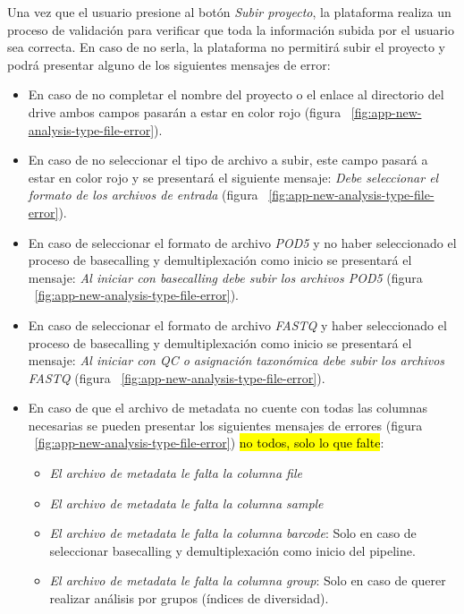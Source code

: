 

Una vez que el usuario presione al botón \textit{Subir proyecto}, la plataforma realiza un proceso de validación para verificar que toda la información subida por el usuario sea correcta. En caso de no serla, la plataforma no permitirá subir el proyecto y podrá presentar alguno de los siguientes mensajes de error:
\begin{itemize}
    \item En caso de no completar el nombre del proyecto o el enlace al directorio del drive ambos campos pasarán a estar en color rojo (figura ~\ref{fig:app-new-analysis-type-file-error}).
    \item En caso de no seleccionar el tipo de archivo a subir, este campo pasará a estar en color rojo y se presentará el siguiente mensaje: \textit{Debe seleccionar el formato de los archivos de entrada} (figura ~\ref{fig:app-new-analysis-type-file-error}).
    \item En caso de seleccionar el formato de archivo \textit{POD5} y no haber seleccionado el proceso de basecalling y demultiplexación como inicio se presentará el mensaje: \textit{Al iniciar con basecalling debe subir los archivos POD5} (figura ~\ref{fig:app-new-analysis-type-file-error}).
    \item En caso de seleccionar el formato de archivo \textit{FASTQ} y haber seleccionado el proceso de basecalling y demultiplexación como inicio se presentará el mensaje: \textit{Al iniciar con QC o asignación taxonómica debe subir los archivos FASTQ} (figura ~\ref{fig:app-new-analysis-type-file-error}).
    \item En caso de que el archivo de metadata no cuente con todas las columnas necesarias se pueden presentar los siguientes mensajes de errores (figura ~\ref{fig:app-new-analysis-type-file-error}) \hl{no todos, solo lo que falte}:
    \begin{itemize}
        \item \textit{El archivo de metadata le falta la columna file}
        \item \textit{El archivo de metadata le falta la columna sample}
        \item \textit{El archivo de metadata le falta la columna barcode}: Solo en caso de seleccionar basecalling y demultiplexación como inicio del pipeline.
        \item \textit{El archivo de metadata le falta la columna group}: Solo en caso de querer realizar análisis por grupos (índices de diversidad).

    \end{itemize}
\end{itemize}


